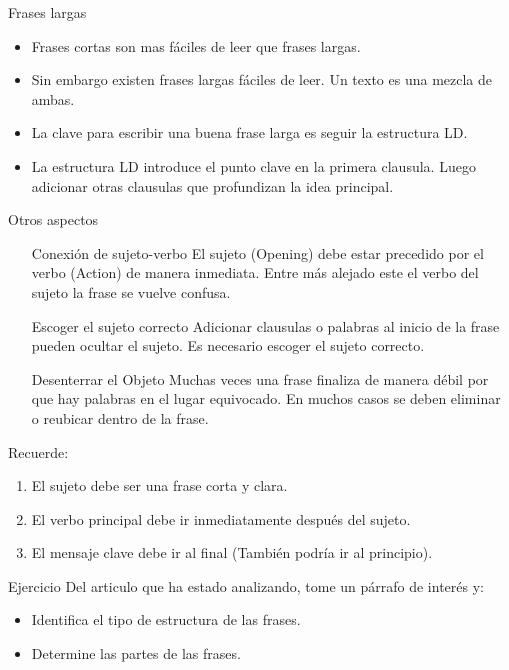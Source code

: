 \documentclass[
10pt,
aspectratio=169,
]{beamer}
\begin{document}
\begin{frame}[c]{Frases largas}

\begin{itemize}
\item Frases cortas son mas f\'aciles de leer que frases largas. 
\item Sin embargo existen frases largas f\'aciles de leer. Un texto es una mezcla de ambas. 
\item La clave para escribir una buena frase larga es seguir la estructura \alert{LD}.
\item La estructura \alert{LD} introduce el punto clave en la primera clausula. Luego adicionar otras clausulas que profundizan la idea principal.  
\end{itemize}
\end{frame}

\begin{frame}[c]{Otros aspectos}
\begin{center}
\begin{minipage}{0.6\linewidth}
\begin{itemize}
\item[Conexi\'on de sujeto-verbo] El sujeto (\alert{O}pening) debe estar precedido por el verbo (\alert{A}ction) de manera inmediata. Entre m\'as alejado este el verbo del sujeto la frase se vuelve confusa.
\item[Escoger el sujeto correcto] Adicionar clausulas o palabras al inicio de la frase pueden ocultar el sujeto. Es necesario escoger el sujeto correcto. 
\item[Desenterrar el Objeto] Muchas veces una frase finaliza de manera d\'ebil por que hay palabras en el lugar equivocado. En muchos casos se deben eliminar o reubicar dentro de la frase. 
\end{itemize}
\end{minipage}
\end{center}
Recuerde:
\begin{enumerate}
\item El sujeto debe ser una frase corta y clara.
\item El verbo principal debe ir inmediatamente despu\'es del sujeto.
\item El mensaje clave debe ir al final (Tambi\'en podr\'ia ir al principio).
\end{enumerate}
\end{frame}

\begin{frame}[c]{Ejercicio}
Del articulo que ha estado analizando, tome un p\'arrafo de inter\'es y:
\begin{itemize}
\item Identifica el tipo de estructura de las frases.
\item Determine las partes de las frases. 
\end{itemize}
\end{frame}
\end{document}
